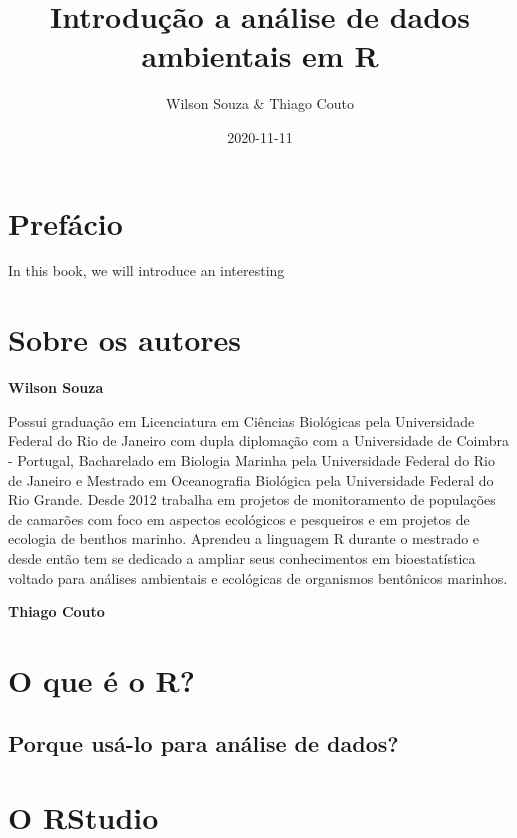 \documentclass[]{book}
\title{Introdução a análise de dados ambientais em R}
\author{Wilson Souza \& Thiago Couto}
\date{2020-11-11}
\begin{document}
\maketitle

{
\setcounter{tocdepth}{1}
\tableofcontents
}
\hypertarget{prefuxe1cio}{%
\chapter*{Prefácio}\label{prefuxe1cio}}

In this book, we will introduce an interesting

\hypertarget{sobre-os-autores}{%
\chapter*{Sobre os autores}\label{sobre-os-autores}}

\textbf{Wilson Souza}

Possui graduação em Licenciatura em Ciências Biológicas pela Universidade Federal do Rio de Janeiro com dupla diplomação com a Universidade de Coimbra - Portugal, Bacharelado em Biologia Marinha pela Universidade Federal do Rio de Janeiro e Mestrado em Oceanografia Biológica pela Universidade Federal do Rio Grande. Desde 2012 trabalha em projetos de monitoramento de populações de camarões com foco em aspectos ecológicos e pesqueiros e em projetos de ecologia de benthos marinho. Aprendeu a linguagem R durante o mestrado e desde então tem se dedicado a ampliar seus conhecimentos em bioestatística voltado para análises ambientais e ecológicas de organismos bentônicos marinhos.

\textbf{Thiago Couto}

\hypertarget{o-que-uxe9-o-r}{%
\chapter{O que é o R?}\label{o-que-uxe9-o-r}}

\hypertarget{porque-usuxe1-lo-para-anuxe1lise-de-dados}{%
\section{Porque usá-lo para análise de dados?}\label{porque-usuxe1-lo-para-anuxe1lise-de-dados}}

\hypertarget{o-rstudio}{%
\chapter{O RStudio}\label{o-rstudio}}
\end{document}
